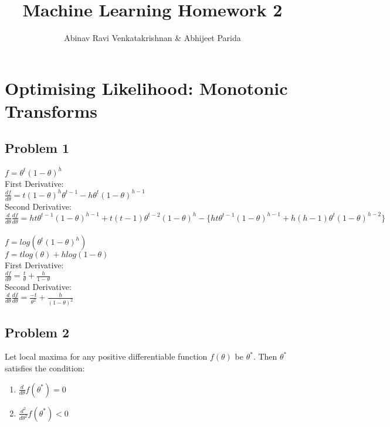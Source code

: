 \documentclass[5pt,a4paper]{article}
\begin{document}
	\title{Machine Learning Homework 2}
	\author{Abinav Ravi Venkatakrishnan \& Abhijeet Parida}
	
	\maketitle
	
	\section{Optimising Likelihood: Monotonic Transforms}
	\subsection*{Problem 1}
	$f=\theta^t(1-\theta)^h$\\
	First Derivative:\\
	$\frac{df}{d \theta}=t(1-\theta)^h\theta^{t-1}- h \theta^t(1-\theta)^{h-1}$\\
	Second Derivative:\\
	$\frac{d}{d \theta}\frac{df}{d \theta}=ht\theta^{t-1}(1-\theta)^{h-1}+t(t-1)\theta^{t-2}(1-\theta)^h-\{ht \theta^{t-1}(1-\theta)^{h-1}+h(h-1)\theta^t(1-\theta)^{h-2}\}$\\\\
	$f=log(\theta^t(1-\theta)^h)$\\
	$f=tlog(\theta)+h log(1-\theta)$\\
	First Derivative:\\
	$\frac{df}{d \theta}=\frac{t}{\theta}+\frac{h}{1-\theta}$\\
	Second Derivative:\\
	$\frac{d}{d \theta}\frac{df}{d \theta}=\frac{-t}{\theta^2}+\frac{h}{(1-\theta)^2}$
	\subsection*{Problem 2}
	Let local maxima for any positive differentiable function $f(\theta)$ be $\theta^*$. Then $\theta^*$ satisfies the condition: 
	\begin{enumerate}
		\item $\frac{d}{d\theta}f(\theta^*)=0$\label{condition1}
		\item $\frac{d^2}{d\theta^2}f(\theta^*)<0$ \label{condition2}
	\end{enumerate}
\end{document}
